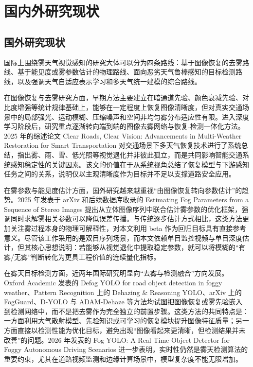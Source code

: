 \chapter{国内外研究现状}

\section{国外研究现状}

国际上围绕雾天气视觉感知的研究大体可以分为四条路线：基于图像恢复的去雾路线、基于能见度或雾参数估计的物理路线、面向恶劣天气鲁棒感知的目标检测路线，以及强调天气自适应表示学习和多天气统一建模的综合路线。

在图像恢复与去雾研究方面，早期方法主要建立在暗通道先验、颜色衰减先验、对比度增强等统计规律基础上，能够在一定程度上恢复图像清晰度，但对真实交通场景中的局部强光、运动模糊、压缩噪声和空间非均匀雾分布适应性有限。进入深度学习阶段后，研究重点逐渐转向端到端的图像去雾网络与恢复-检测一体化方法。2025 年的综述论文 Clear Roads, Clear Vision: Advancements in Multi-Weather Restoration for Smart Transportation 对交通场景下多天气恢复技术进行了系统总结，指出雾、雨、雪、低光照等视觉退化并非彼此孤立，而是共同影响智能交通系统感知稳定性的关键因素。该文的价值在于从系统视角总结了恢复模型与下游感知任务之间的关系，说明仅以主观清晰度作为目标并不足以支撑道路安全应用。

在雾参数与能见度估计方面，国外研究越来越重视“由图像恢复转向参数估计”的趋势。2025 年发表于 arXiv 和后续数据库收录的 Estimating Fog Parameters from a Sequence of Stereo Images 提出从立体图像序列中联合估计雾参数的优化框架，强调同时求解雾相关参数可以降低误差传播。与传统逐步估计方式相比，这类方法更加关注雾过程本身的物理可解释性，对本文利用 beta 作为回归目标具有直接参考意义。尽管该工作采用的是双目序列场景，而本文依赖单目监控视频与单目深度估计，但其核心思想说明：若能够从视觉退化中提取稳定参数，就可以将模糊的“有雾/无雾”判断转化为更具工程价值的连续量化指标。

在雾天目标检测方面，近两年国际研究明显向“去雾与检测融合”方向发展。Oxford Academic 发表的 Defog YOLO for road object detection in foggy weather、Pattern Recognition 上的 Dehazing \& Reasoning YOLO、arXiv 上的 FogGuard、D-YOLO 与 ADAM-Dehaze 等方法均试图把图像恢复或雾先验嵌入到检测网络中，而不是把去雾作为完全独立的前置步骤。这类方法的共同特点是：一方面利用大气散射模型、先验知识或可学习的恢复模块提升图像特征质量；另一方面直接以检测性能为优化目标，避免出现“图像看起来更清晰，但检测结果并未改善”的问题。2026 年发表的 Fog-YOLO: A Real-Time Object Detector for Foggy Autonomous Driving Scenarios 进一步表明，实时性仍然是雾天检测算法的重要约束，尤其在道路视频监测和边缘计算场景中，模型复杂度不能无限增加。

